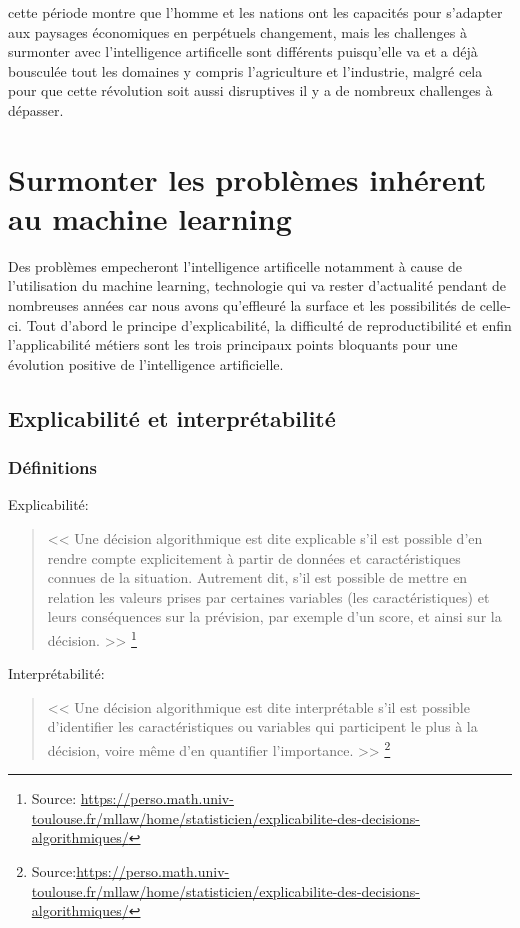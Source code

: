     cette période montre que l'homme et les nations ont les capacités pour s'adapter 
    aux paysages économiques en perpétuels changement, mais les challenges à surmonter 
    avec l'intelligence artificelle sont différents puisqu'elle va et a déjà bousculée tout 
    les domaines y compris l'agriculture et l'industrie, malgré cela pour que cette 
    révolution soit aussi disruptives il y a de nombreux challenges à dépasser.


    \chapter{Surmonter les problèmes inhérent au machine learning }
        Des problèmes empecheront l'intelligence artificelle notamment à cause de l'utilisation 
        du machine learning, technologie qui va rester d'actualité pendant de nombreuses années car nous
        avons qu'effleuré la surface et les possibilités de celle-ci.
        Tout d'abord le principe d'explicabilité, la difficulté de reproductibilité et enfin l'applicabilité 
        métiers sont les trois principaux points bloquants pour une évolution positive de 
        l'intelligence artificielle. \newline

        \section{Explicabilité et interprétabilité}
            \subsection*{Définitions}
            Explicabilité: 
            \begin{quote}
                << Une décision algorithmique est dite explicable s’il est possible d’en rendre compte 
                explicitement à partir de données et caractéristiques connues de la situation. 
                Autrement dit, s’il est possible de mettre en relation les valeurs prises 
                par certaines variables (les caractéristiques) et leurs conséquences  
                sur la prévision, par exemple d’un score, et ainsi sur la décision. >>
                \footnote{Source: \url{https://perso.math.univ-toulouse.fr/mllaw/home/statisticien/explicabilite-des-decisions-algorithmiques/}}
                \newline 
            \end{quote}

            Interprétabilité:
            \begin{quote}
                << Une décision algorithmique est dite interprétable s’il est possible d’identifier 
                les caractéristiques ou variables qui participent le plus à la décision, 
                voire même d’en quantifier l’importance. >>
                \footnote{Source:\url{https://perso.math.univ-toulouse.fr/mllaw/home/statisticien/explicabilite-des-decisions-algorithmiques/}}
                \newline
            \end{quote}

